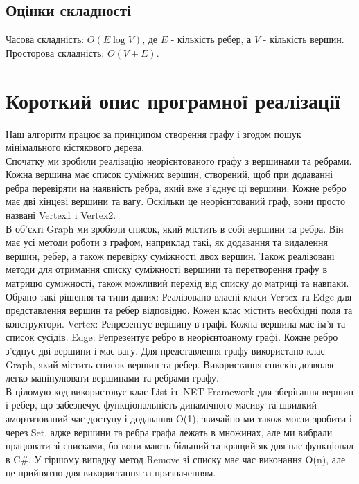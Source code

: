 \documentclass[titlepage, a4paper]{article}
\begin{document}
\subsection{Оцінки складності}
Часова складність: \(O(E\log V)\), де \(E\) - кількість ребер, а \(V\) - кількість вершин. \\
Просторова складність: \(O(V+E)\).

\section{Короткий опис програмної реалізації}

Наш алгоритм працює за принципом створення 
графу і згодом пошук мінімального кістякового дерева.\\
Спочатку ми зробили реалізацію неорієнтованого графу з вершинами та ребрами. Кожна вершина має список суміжних вершин, створений, щоб при додаванні ребра перевіряти на наявність ребра, який вже з'єднує ці вершини. Кожне ребро має дві кінцеві вершини та вагу. Оскільки це неорієнтований граф, вони просто названі Vertex1 i Vertex2. \\

В об’єкті Graph ми зробили список, який містить в собі вершини та ребра. Він має усі методи роботи з графом, наприклад такі, як додавання та видалення вершин, ребер, а також перевірку суміжності двох вершин. Також реалізовані методи для отримання списку суміжності вершини та перетворення графу в матрицю суміжності, також можливий перехід від списку до матриці та навпаки.\\

Обрано такі рішення та типи даних:
Реалізовано власні класи Vertex та Edge для представлення вершин та ребер відповідно. Кожен клас містить необхідні поля та конструктори.
Vertex: Репрезентує вершину в графі. Кожна вершина має ім'я та список сусідів.
Edge: Репрезентує ребро в неорієнтоаному графі. Кожне ребро з'єднує дві вершини і має вагу.
Для представлення графу використано клас Graph, який містить список вершин та ребер. Використання списків дозволяє легко маніпулювати вершинами та ребрами графу.\\

В ціломую код використовує клас List із .NET Framework для зберігання вершин і ребер, що забезпечує функціональність динамічного масиву та швидкий амортизований час доступу і додавання O(1), звичайно ми також могли зробити і через Set, адже вершини та ребра графа лежать в множинах, але ми вибрали працювати зі списками, бо вони мають більший та кращий як для нас функціонал в C\#. У гіршому випадку метод Remove зі списку має час виконання O(n), але це прийнятно для використання за призначенням.\\
\end{document}
